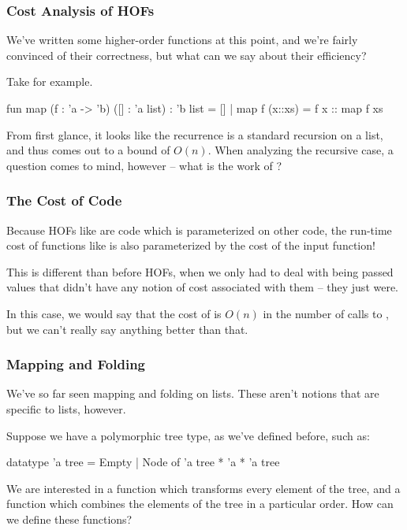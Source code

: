\documentclass[aspectratio=169]{beamer}
\begin{document}

\begin{frame}[fragile]
  \frametitle{Cost Analysis of HOFs}

  We've written some higher-order functions at this point, and we're fairly convinced
  of their correctness, but what can we say about their efficiency?

  Take  for example.

  \begin{codeblock}
    fun map (f : 'a -> 'b) ([] : 'a list) : 'b list = []
      | map f (x::xs) = f x :: map f xs
  \end{codeblock}

  From first glance, it looks like the recurrence is a standard recursion on a list,
  and thus comes out to a bound of $O(n)$. When analyzing the recursive case, a question
  comes to mind, however -- what is the work of ?
\end{frame}

\begin{frame}[fragile]
  \frametitle{The Cost of Code}

  Because HOFs like  are code which is parameterized on other code, 
  the run-time cost of functions like  is also parameterized by 
  the cost of the input function!

  This is different than before HOFs, when we only had to deal with being passed
  values that didn't have any notion of cost associated with them -- they just were.

  In this case, we would say that the cost of  is $O(n)$ in the number of
  calls to , but we can't really say anything better than that.
\end{frame}


\begin{frame}[fragile]
  \frametitle{Mapping and Folding}

  We've so far seen mapping and folding on lists. These aren't notions that are 
  specific to lists, however\footnotemark.

  Suppose we have a polymorphic tree type, as we've defined before, such as:
  \begin{codeblock}
    datatype 'a tree = Empty | Node of 'a tree * 'a * 'a tree
  \end{codeblock}

  We are interested in a  function which transforms every element of the
  tree, and a  function which combines the elements of the tree in a 
  particular order. How can we define these functions?

\end{frame}
\end{document}
